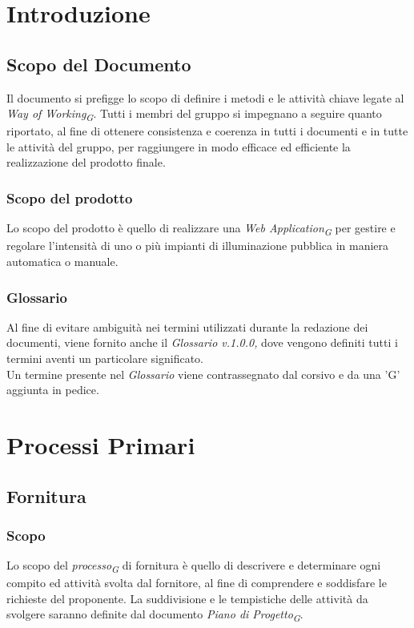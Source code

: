 \documentclass[a4paper, 12pt]{article}
\begin{document}
\makeindexdetails
\makefrontpage \makeversioni
\tableofcontents
\newpage
\clearpage
{} 

\section{Introduzione}
\subsection{Scopo del Documento}
Il documento si prefigge lo scopo di definire i metodi e le attività chiave
legate al \textit{Way of Working}\textsubscript{\textit{G}}. Tutti i membri del gruppo si impegnano a
seguire quanto riportato, al fine di ottenere consistenza e coerenza in tutti i
documenti e in tutte le attività del gruppo, per raggiungere in modo efficace ed
efficiente la realizzazione del prodotto finale.

\subsubsection{Scopo del prodotto}
Lo scopo del prodotto è quello di realizzare una \textit{Web Application}\textsubscript{\textit{G}} per
gestire e regolare l'intensità di uno o più impianti di illuminazione pubblica
in maniera automatica o manuale.

\subsubsection{Glossario}
Al fine di evitare ambiguità nei termini utilizzati durante la redazione dei
documenti, viene fornito anche il \textit{Glossario v.1.0.0,} dove vengono
definiti tutti i termini aventi un particolare significato. \\
Un termine presente nel \textit{Glossario} viene contrassegnato dal corsivo e
da una 'G' aggiunta in pedice.
\newpage

\section{Processi Primari}
\subsection{Fornitura}
\subsubsection{Scopo}
Lo scopo del \textit{processo}\textsubscript{\textit{G}} di fornitura è quello di descrivere e determinare ogni
compito ed attività svolta dal fornitore, al fine di comprendere e soddisfare le
richieste del proponente. 
La suddivisione e le tempistiche delle attività da svolgere saranno definite dal documento
\textit{Piano di Progetto}\textsubscript{\textit{G}}.
\end{document}
